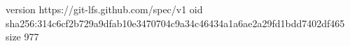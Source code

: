 version https://git-lfs.github.com/spec/v1
oid sha256:314c6cf2b729a9dfab10e3470704c9a34c46434a1a6ae2a29fd1bdd7402df465
size 977
